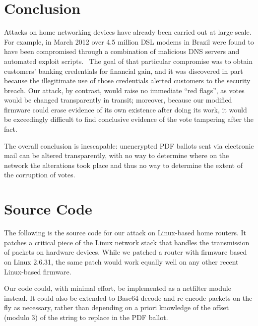 \documentclass{article}
\begin{document}
\section{Conclusion}

Attacks on home networking devices have already been carried out at
large scale. For example, in March 2012 over 4.5 million DSL modems in
Brazil were found to have been compromised through a combination of
malicious DNS servers and automated exploit
scripts.~\cite{BrazilExploit} The goal of that particular compromise
was to obtain customers' banking credentials for financial gain, and
it was discovered in part because the illegitimate use of those
credentials alerted customers to the security breach. Our attack, by
contrast, would raise no immediate ``red flags'', as votes would be
changed transparently in transit; moreover, because our modified
firmware could erase evidence of its own existence after doing its
work, it would be exceedingly difficult to find conclusive evidence of
the vote tampering after the fact.

The overall conclusion is inescapable: unencrypted PDF ballots sent
via electronic mail can be altered transparently, with no way to
determine where on the network the alterations took place and thus no
way to determine the extent of the corruption of votes. 




\appendix
\section{Source Code}
\label{section:source}



The following is the source code for our attack on Linux-based home
routers. It patches a critical piece of the Linux network stack that
handles the transmission of packets on hardware devices. While we
patched a router with firmware based on Linux 2.6.31, the same patch
would work equally well on any other recent Linux-based firmware. 

Our code could, with minimal effort, be implemented as a netfilter
module instead. It could also be extended to Base64 decode and
re-encode packets on the fly as necessary, rather than depending on a
priori knowledge of the offset (modulo 3) of the string to replace
in the PDF ballot.

\pagebreak


\end{document}
